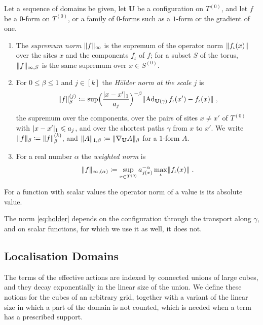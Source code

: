 \documentclass[11pt]{preprint}
\newcommand{\Ad}{\operatorname{Ad}}
\DeclarePairedDelimiter{\abs}{\lvert}{\rvert}
\DeclarePairedDelimiter{\norm}{\lVert}{\rVert}
\numberwithin{equation}{section}
\begin{document}
\begin{definition}[Norms]\label{def:norms}
Let a sequence of domains be given, let $\mathbf U$ be a configuration on $T^{(0)}$, and let $f$ be a $0$-form on $T^{(0)}$, or a family of $0$-forms such as a $1$-form or the gradient of one.
\begin{enumerate}[label=(\roman*)]
\item The \emph{supremum norm} $\norm f_\infty$ is the supremum of the operator norm $\norm{f_\iota(x)}$ over the sites $x$ and the components $f_\iota$ of $f$; for a subset $S$ of the torus, $\norm f_{\infty,S}$ is the same supremum over $x \in S^{(0)}$.
\item For $0 \leqslant \beta \leqslant 1$ and $j \in [k]$ the \emph{H\"older norm at the scale $j$} is
\begin{equation}\label{eq:holder}
    \norm f_\beta^{(j)} \coloneqq \sup\Bigl(\frac{\abs{x - x'}_1}{a_j}\Bigr)^{-\beta}\norm{\Ad_{\mathbf U(\gamma)}f_\iota(x') - f_\iota(x)}\;,
\end{equation}
the supremum over the components, over the pairs of sites $x \neq x'$ of $T^{(0)}$ with $\abs{x - x'}_1 \leqslant a_j$, and over the shortest paths $\gamma$ from $x$ to $x'$. We write $\norm f_\beta \coloneqq \norm f_\beta^{(k)}$, and $\norm A_{1,\beta} \coloneqq \norm{\nabla_{\mathbf U}A}_\beta$ for a $1$-form $A$.
\item For a real number $\alpha$ the \emph{weighted norm} is
\begin{equation}\label{eq:weighted-norm}
    \norm f_{\infty,(\alpha)} \coloneqq \sup_{x \in T^{(0)}}a_{j(x)}^{-\alpha}\max_\iota\norm{f_\iota(x)}\;.
\end{equation}
\end{enumerate}
For a function with scalar values the operator norm of a value is its absolute value.
\end{definition}

The norm \eqref{eq:holder} depends on the configuration through the transport along $\gamma$, and on scalar functions, for which we use it as well, it does not.

\subsection{Localisation Domains}\label{sec:localisation-domains}

The terms of the effective actions are indexed by connected unions of large cubes, and they decay exponentially in the linear size of the union. We define these notions for the cubes of an arbitrary grid, together with a variant of the linear size in which a part of the domain is not counted, which is needed when a term has a prescribed support.
\end{document}
